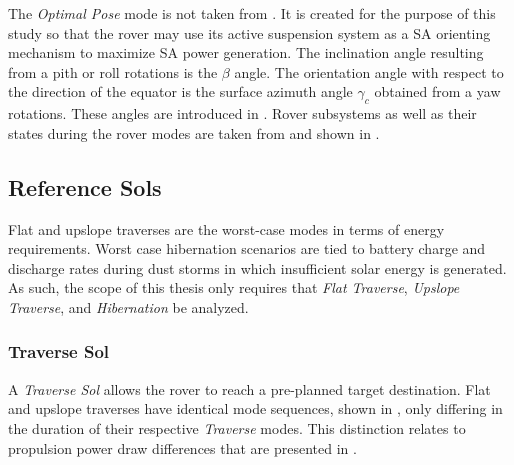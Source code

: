 
The \textit{Optimal Pose} mode is not taken from . It is created for the purpose of this study so that the rover may use its active suspension system as a \ac{SA} orienting mechanism to maximize \ac{SA} power generation. The inclination angle resulting from a pith or roll rotations is  the $\beta$ angle. The orientation angle with respect to the direction of the equator is the surface azimuth angle $\gamma_{c}$ obtained from a yaw rotations. These angles are introduced in . Rover subsystems as well as their states during the rover modes are taken from  and shown in .






\subsection{Reference Sols}
\label{sec:ReferenceSols:ReferenceSols}
Flat and upslope traverses are the worst-case modes in terms of energy requirements. Worst case hibernation scenarios are tied to battery charge and discharge rates during dust storms in which insufficient solar energy is generated. As such, the scope of this thesis only requires that \textit{Flat Traverse}, \textit{Upslope Traverse}, and \textit{Hibernation} be analyzed.


\subsubsection{Traverse Sol}
\label{sec:ReferenceSols:TraverseSol}
A \textit{Traverse Sol} allows the rover to reach a pre-planned target destination. Flat and upslope traverses have identical mode sequences, shown in , only differing in the duration of their respective \textit{Traverse} modes. This distinction relates to propulsion power draw differences that are presented in .

